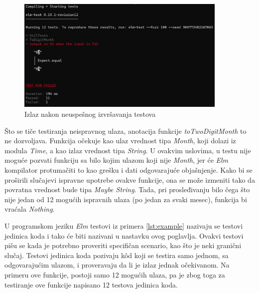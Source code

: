 \documentclass[12pt,oneside]{memoir}
\begin{document}
\begin{figure}[!ht]
  \centering
  \includegraphics[width=0.9\textwidth]{elmfail.png}
  \caption{Izlaz nakon neuspešnog izvršavanja testova}
  \label{fig:elmfail}
\end{figure}

\par Što se tiče testiranja neispravnog ulaza, anotacija funkcije \emph{toTwoDigitMonth} to ne dozvoljava. Funkcija očekuje kao ulaz vrednost tipa \emph{Month}, koji dolazi iz modula \emph{Time}, a kao izlaz vrednost tipa \emph{String}. U ovakvim uslovima, u testu nije moguće pozvati funkciju sa bilo kojim ulazom koji nije \emph{Month}, jer će \emph{Elm} kompilator protumačiti to kao grešku i dati odgovarajuće objašnjenje. Kako bi se proširili slučajevi ispravne upotrebe ovakve funkcije, ona se može izmeniti tako da povratna vrednost bude tipa \emph{Maybe String}. Tada, pri prosleđivanju bilo čega što nije jedan od 12 mogućih ispravnih ulaza (po jedan za svaki mesec), funkcija bi vraćala \emph{Nothing}.
\par U programskom jeziku \emph{Elm} testovi iz primera \ref{lst:example} nazivaju se testovi jedinica koda i tako će biti nazivani u nastavku ovog poglavlja. Ovakvi testovi pišu se kada je potrebno proveriti specifičan scenario, kao što je neki granični slučaj. Testovi jedinica koda pozivaju k\^{o}d koji se testira samo jednom, sa odgovarajućim ulazom, i proveravaju da li je izlaz jednak očekivanom. Na primeru ove funkcije, postoji samo 12 mogućih ulaza, pa je zbog toga za testiranje ove funkcije napisano 12 testova jedinica koda. 
\end{document}
